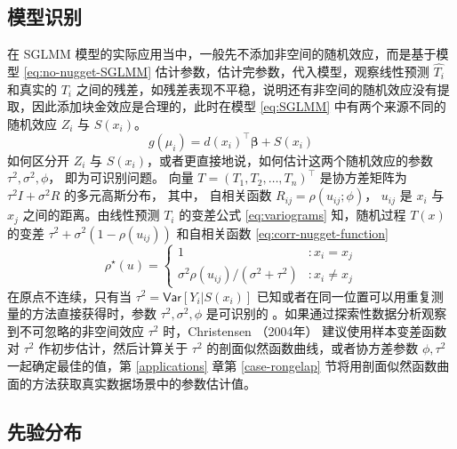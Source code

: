 \documentclass[12pt,a4paper,UTF8,twoside]{book}
\theoremstyle{definition}
\theoremstyle{definition}
\theoremstyle{definition}
\theoremstyle{remark}
\begin{document}
\hypertarget{subsec:identify}{%
\subsection{模型识别}\label{subsec:identify}}

在 SGLMM 模型的实际应用当中，一般先不添加非空间的随机效应，而是基于模型
\eqref{eq:no-nugget-SGLMM} 估计参数，估计完参数，代入模型，观察线性预测
\(\hat{T_{i}}\) 和真实的 \(T_i\)
之间的残差，如残差表现不平稳，说明还有非空间的随机效应没有提取，因此添加块金效应是合理的，此时在模型
\eqref{eq:SGLMM} 中有两个来源不同的随机效应 \(Z_{i}\) 与 \(S(x_i)\)。
\begin{equation}
g(\mu_i) = d(x_i)^{\top}\boldsymbol{\beta} + S(x_i) \label{eq:no-nugget-SGLMM}
\end{equation} 如何区分开 \(Z_{i}\) 与
\(S(x_i)\)，或者更直接地说，如何估计这两个随机效应的参数
\(\tau^2, \sigma^2, \phi\)， 即为可识别问题。 向量
\(T = (T_1,T_2,\ldots,T_n)^{\top}\) 是协方差矩阵为
\(\tau^2I + \sigma^2R\) 的多元高斯分布， 其中， 自相关函数
\(R_{ij} = \rho(u_{ij}; \phi)\)， \(u_{ij}\) 是 \(x_i\) 与 \(x_j\)
之间的距离。由线性预测 \(T_{i}\) 的变差公式 \eqref{eq:variograms}
知，随机过程 \(T(x)\) 的变差 \(\tau^2 + \sigma^2(1-\rho(u_{ij}))\)
和自相关函数 \eqref{eq:corr-nugget-function} \begin{equation}
\rho^{\star}(u) =
\begin{cases}
                                     1 & : x_{i} = x_{j}  \\
\sigma^2\rho(u_{ij})/(\sigma^2+\tau^2) & : x_{i} \neq x_{j}
\end{cases} \label{eq:corr-nugget-function}
\end{equation} \noindent 在原点不连续，只有当
\(\tau^2 = \mathsf{Var}[Y_i|S(x_i)]\)
已知或者在同一位置可以用重复测量的方法直接获得时，参数
\(\tau^2, \sigma^2, \phi\) 是可识别的
\citep{Diggle2002Childhood, Diggle2007}。如果通过探索性数据分析观察到不可忽略的非空间效应
\(\tau^2\) 时，Christensen （2004年） \citep{Christensen2004}
建议使用样本变差函数对 \(\tau^2\) 作初步估计，然后计算关于 \(\tau^2\)
的剖面似然函数曲线，或者协方差参数 \(\phi,\tau^2\)一起确定最佳的值，第
\ref{applications} 章第 \ref{case-rongelap}
节将用剖面似然函数曲面的方法获取真实数据场景中的参数估计值。

\hypertarget{subsec:prior-sglmm}{%
\subsection{先验分布}\label{subsec:prior-sglmm}}
\end{document}
